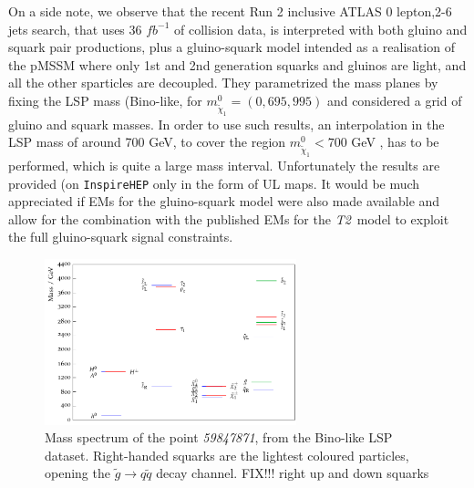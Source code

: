 \documentclass[a4paper,11pt]{article}
\newcommand{\Ttwo}{ \textit{T2}}
\begin{document}
On a side note, we observe that the recent Run 2 inclusive ATLAS 0 lepton,2-6 jets search\cite{Aaboud:2017vwy}, that uses 36 $fb^{-1}$ of collision data, is interpreted with both gluino and squark pair productions, plus a gluino-squark model intended as a realisation of the pMSSM where only 1st and 2nd generation squarks and gluinos are light, and all the other sparticles are decoupled. They parametrized the mass planes by fixing the LSP mass (Bino-like, for $m_{\tilde \chi _1} ^0 = (0,695,995)$ and considered a grid of gluino and squark masses. In order to use such results, an interpolation in the LSP mass of around 700 GeV, to cover the region $m_{\tilde \chi _1} ^0 < 700$ GeV , has to be performed, which is quite a large mass interval. Unfortunately the results are provided (on \texttt{InspireHEP}\cite{HEP201607} only in the form of UL maps. It would be much appreciated if EMs for the gluino-squark model were also made available and allow for the combination with the published EMs for the \Ttwo~model to exploit the full gluino-squark signal constraints.

\begin{figure}
	\begin{center}		
		\includegraphics[width=0.65\textwidth]{PLOTS/13TeV/59847871.pdf}
	\end{center}
	\caption{Mass spectrum of the point \textit{59847871}, from the Bino-like LSP dataset. Right-handed squarks are the lightest coloured particles, opening the $\tilde g \rightarrow q \tilde q $ decay channel. {\color{blue} FIX!!! right up and down squarks}} 
	\label{pyslha}
\end{figure}
\end{document}
